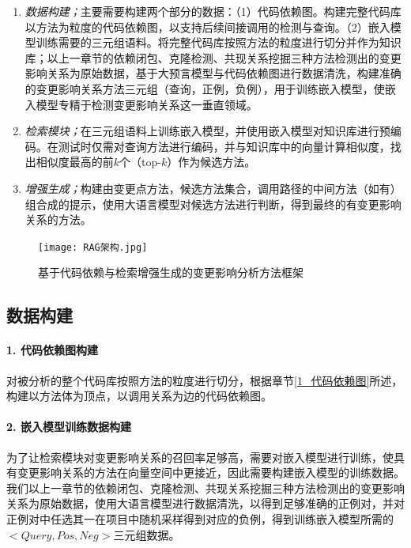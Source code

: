 \begin{enumerate}

    \item \textit{数据构建；}主要需要构建两个部分的数据：（1）代码依赖图。构建完整代码库以方法为粒度的代码依赖图，以支持后续间接调用的检测与查询。（2）嵌入模型训练需要的三元组语料。将完整代码库按照方法的粒度进行切分并作为知识库；以上一章节的依赖闭包、克隆检测、共现关系挖掘三种方法检测出的变更影响关系为原始数据，基于大预言模型与代码依赖图进行数据清洗，构建准确的变更影响关系方法三元组（查询，正例，负例），用于训练嵌入模型，使嵌入模型专精于检测变更影响关系这一垂直领域。

    \item \textit{检索模块；}在三元组语料上训练嵌入模型，并使用嵌入模型对知识库进行预编码。在测试时仅需对查询方法进行编码，并与知识库中的向量计算相似度，找出相似度最高的前$k$个（top-$k$）作为候选方法。
    
    \item \textit{增强生成；}构建由变更点方法，候选方法集合，调用路径的中间方法（如有）组合成的提示，使用大语言模型对候选方法进行判断，得到最终的有变更影响关系的方法。
    
\end{enumerate}

\begin{figure}[htbp]
\centering
\texttt{[image: RAG架构.jpg]}
\caption{基于代码依赖与检索增强生成的变更影响分析方法框架}
\label{2_基于代码依赖与检索增强生成的变更影响分析方法框架}
\end{figure}


\subsection{数据构建}


\paragraph{1. 代码依赖图构建} 对被分析的整个代码库按照方法的粒度进行切分，根据章节\ref{1_代码依赖图}所述，构建以方法体为顶点，以调用关系为边的代码依赖图。

\paragraph{2. 嵌入模型训练数据构建} 为了让检索模块对变更影响关系的召回率足够高，需要对嵌入模型进行训练，使具有变更影响关系的方法在向量空间中更接近，因此需要构建嵌入模型的训练数据。我们以上一章节的依赖闭包、克隆检测、共现关系挖掘三种方法检测出的变更影响关系为原始数据，使用大语言模型进行数据清洗，以得到足够准确的正例对，并对正例对中任选其一在项目中随机采样得到对应的负例，得到训练嵌入模型所需的$<Query,Pos,Neg>$三元组数据。

